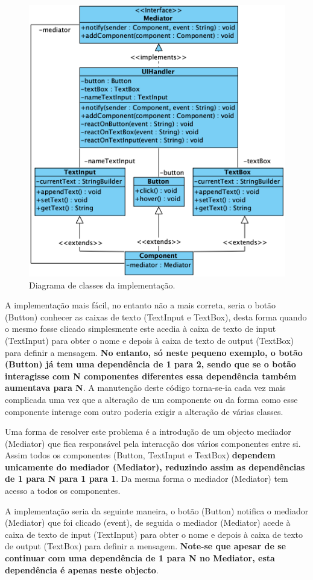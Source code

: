 \begin{figure}[H]
    \centering
    \includegraphics[scale=0.5]{images/class_diagram_mediator.png}
    \caption{Diagrama de classes da implementação.}
    \label{fig:mediator-1}
\end{figure}

A implementação mais fácil, no entanto não a mais correta, seria o botão (Button) conhecer as caixas de texto (TextInput e TextBox), desta forma quando o mesmo fosse clicado simplesmente este acedia à caixa de texto de input (TextInput) para obter o nome e depois à caixa de texto de output (TextBox) para definir a mensagem. \textbf{No entanto, só neste pequeno exemplo, o botão (Button) já tem uma dependência de 1 para 2, sendo que se o botão interagisse com N componentes diferentes essa dependência também aumentava para N}. A manutenção deste código torna-se-ia cada vez mais complicada uma vez que a alteração de um componente ou da forma como esse componente interage com outro poderia exigir a alteração de várias classes.

Uma forma de resolver este problema é a introdução de um objecto mediador (Mediator) que fica responsável pela interacção dos vários componentes entre si. Assim todos os componentes (Button, TextInput e TextBox) \textbf{dependem unicamente do mediador (Mediator), reduzindo assim as dependências de 1 para N para 1 para 1}. Da mesma forma o mediador (Mediator) tem acesso a todos os componentes.

A implementação seria da seguinte maneira, o botão (Button) notifica o mediador (Mediator) que foi clicado (event), de seguida o mediador (Mediator) acede à caixa de texto de input (TextInput) para obter o nome e depois à caixa de texto de output (TextBox) para definir a mensagem. \textbf{Note-se que apesar de se continuar com uma dependência de 1 para N no Mediator, esta dependência é apenas neste objecto}.

